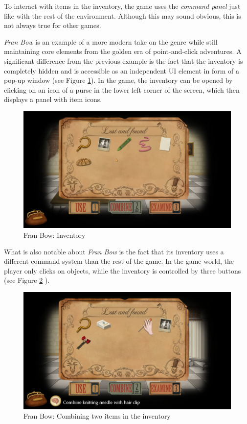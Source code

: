 To interact with items in the inventory, the game uses the \textit{command panel} just like with the rest of the environment. Although this may sound obvious, this is not always true for other games. 

\textit{Fran Bow} is an example of a more modern take on the genre while still maintaining core elements from the golden era of point-and-click adventures.  A significant difference from the previous example is the fact that the inventory is completely hidden and is accessible as an independent UI element in form of a pop-up window (see Figure \ref{fig:I-FranBow}). In the game, the inventory can be opened by clicking on an icon of a purse in the lower left corner of the screen, which then displays a panel with item icons.

\begin{figure}[H]
\centering
\includegraphics[width=.8\linewidth]{img/I-FB.png}
\caption{Fran Bow: Inventory}
\label{fig:I-FranBow}
\end{figure}

What is also notable about \textit{Fran Bow} is the fact that its inventory uses a different command system than the rest of the game. In the game world, the player only clicks on objects, while the inventory is controlled by three buttons (see Figure \ref{fig:C-FranBow} ). 

\begin{figure}[H]
\centering
\includegraphics[width=.8\linewidth]{img/Fran_Bow.png}
\caption{Fran Bow: Combining two items in the inventory}
\label{fig:C-FranBow}
\end{figure}

